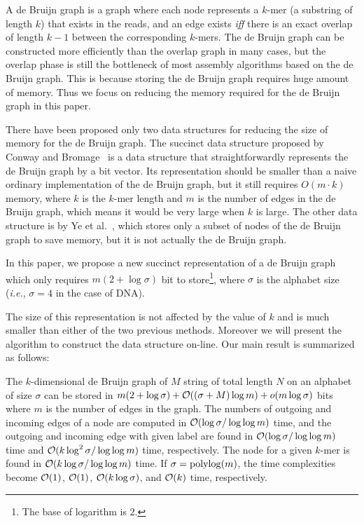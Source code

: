 A de Bruijn graph is a graph where each node represents a $k$-mer
(a substring of length $k$)
that exists in the reads, and an edge exists {\it iff} there is an 
exact overlap of length $k-1$ between the corresponding $k$-mers. 
The de Bruijn graph can be constructed more efficiently than the overlap graph 
in many cases, 
but the overlap phase is still the bottleneck of most assembly algorithms based 
on the de Bruijn graph. 
This is because storing the de Bruijn graph requires huge amount of memory. 
Thus we focus on reducing the memory required for the de Bruijn graph in this paper. 

There have been proposed only two data structures for
reducing the size of memory for the de Bruijn graph.
The succinct data structure proposed by Conway and Bromage~\cite{conway}
is a data structure that straightforwardly
represents the de Bruijn graph by a bit vector.
Its representation should be smaller than a naive ordinary implementation of
the de Bruijn graph, but it still requires $O(m\cdot k)$ memory,
where $k$ is the $k$-mer length and $m$ is the number of edges in the de Bruijn graph,
which means it would be very large when $k$ is large.
The other data structure is by Ye et al.~\cite{YeMa12}, which
stores only a subset of nodes of the de Bruijn graph to save memory,
but it is not actually the de Bruijn graph.

In this paper, we propose a new succinct representation of a de Bruijn graph which only requires $m(2+\log \sigma)$ bit to store\footnote{The base of logarithm is $2$.}, where $\sigma$ is the alphabet size ({\it i.e.}, $\sigma = 4$ in the case of DNA).



The size of this representation is not affected by the value of $k$ and is
much smaller than either of the two previous methods.
Moreover we will present the algorithm to construct the data structure on-line.
Our main result is summarized as follows:
\begin{theorem}
The $k$-dimensional de Bruijn graph of $M$ string of total length $N$ on an alphabet of size $\sigma$
can be stored in $m(2+\log \sigma) + \mathcal{O}((\sigma+M) \log m) + o(m \log\sigma)$
bits where $m$ is the number of edges in the graph.  
The numbers of outgoing and incoming edges of a node are computed in $\mathcal{O}(\log\sigma/\log\log m)$ time,
and the outgoing and incoming edge with given label are found in $\mathcal{O}(\log\sigma/\log\log m)$ time
and $\mathcal{O}(k\log^2\sigma/\log\log m)$ time, respectively.
The node for a given $k$-mer is found in $\mathcal{O}(k\log\sigma/\log\log m)$ time.
If $\sigma = {\mathop{\mathrm{polylog}}\nolimits}(m)$, the time complexities become $\mathcal{O}(1)$, $\mathcal{O}(1)$, $\mathcal{O}(k\log\sigma)$,
and $\mathcal{O}(k)$ time, respectively.
\end{theorem}

